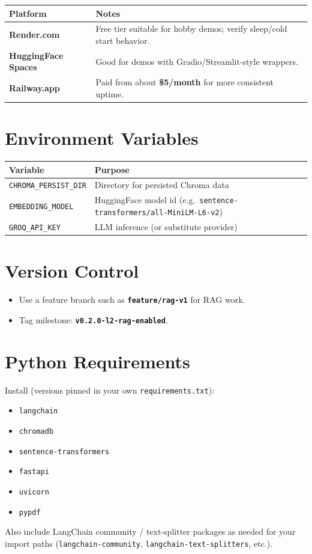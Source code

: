 \documentclass{article}
\begin{document}
\begin{tabular}{@{}lp{7.5cm}@{}}
\toprule
\textbf{Platform} & \textbf{Notes} \\
\midrule
\textbf{Render.com} & Free tier suitable for hobby demos; verify sleep/cold start behavior. \\
\textbf{HuggingFace Spaces} & Good for demos with Gradio/Streamlit-style wrappers. \\
\textbf{Railway.app} & Paid from about \textbf{\$5/month} for more consistent uptime. \\
\bottomrule
\end{tabular}

\section{Environment Variables}

\begin{tabular}{@{}lp{7cm}@{}}
\toprule
\textbf{Variable} & \textbf{Purpose} \\
\midrule
\texttt{CHROMA\_PERSIST\_DIR} & Directory for persisted Chroma data \\
\texttt{EMBEDDING\_MODEL} & HuggingFace model id (e.g.\ \texttt{sentence-transformers/all-MiniLM-L6-v2}) \\
\texttt{GROQ\_API\_KEY} & LLM inference (or substitute provider) \\
\bottomrule
\end{tabular}

\section{Version Control}

\begin{itemize}[leftmargin=*]
  \item Use a feature branch such as \textbf{\texttt{feature/rag-v1}} for RAG work.
  \item Tag milestone: \textbf{\texttt{v0.2.0-l2-rag-enabled}}.
\end{itemize}

\section{Python Requirements}

Install (versions pinned in your own \texttt{requirements.txt}):

\begin{itemize}[leftmargin=*]
  \item \texttt{langchain}
  \item \texttt{chromadb}
  \item \texttt{sentence-transformers}
  \item \texttt{fastapi}
  \item \texttt{uvicorn}
  \item \texttt{pypdf}
\end{itemize}

Also include LangChain community / text-splitter packages as needed for your import paths (\texttt{langchain-community}, \texttt{langchain-text-splitters}, etc.).
\end{document}
